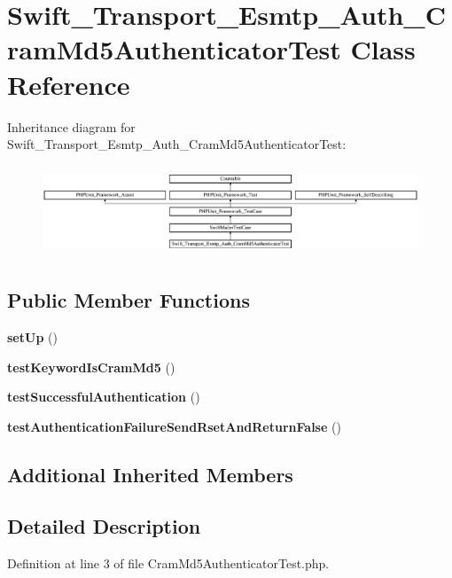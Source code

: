 \section{Swift\+\_\+\+Transport\+\_\+\+Esmtp\+\_\+\+Auth\+\_\+\+Cram\+Md5\+Authenticator\+Test Class Reference}
\label{class_swift___transport___esmtp___auth___cram_md5_authenticator_test}
Inheritance diagram for Swift\+\_\+\+Transport\+\_\+\+Esmtp\+\_\+\+Auth\+\_\+\+Cram\+Md5\+Authenticator\+Test\+:\begin{figure}[H]
\begin{center}
\leavevmode
\includegraphics[height=2.737048cm]{class_swift___transport___esmtp___auth___cram_md5_authenticator_test}
\end{center}
\end{figure}
\subsection*{Public Member Functions}
\begin{DoxyCompactItemize}
\item 
{\bf set\+Up} ()
\item 
{\bf test\+Keyword\+Is\+Cram\+Md5} ()
\item 
{\bf test\+Successful\+Authentication} ()
\item 
{\bf test\+Authentication\+Failure\+Send\+Rset\+And\+Return\+False} ()
\end{DoxyCompactItemize}
\subsection*{Additional Inherited Members}


\subsection{Detailed Description}


Definition at line 3 of file Cram\+Md5\+Authenticator\+Test.\+php.



